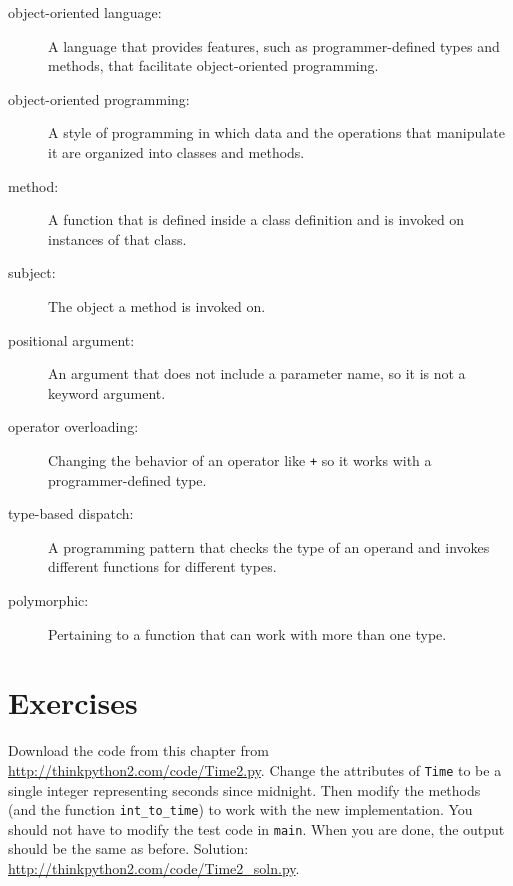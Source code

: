 \documentclass[10pt]{book}
\begin{document}
\begin{description}

\item[object-oriented language:] A language that provides features,
  such as programmer-defined types and methods, that facilitate
  object-oriented programming.

\item[object-oriented programming:] A style of programming in which
data and the operations that manipulate it are organized into classes
and methods.

\item[method:] A function that is defined inside a class definition and
is invoked on instances of that class.

\item[subject:] The object a method is invoked on.

\item[positional argument:]  An argument that does not include
a parameter name, so it is not a keyword argument.

\item[operator overloading:] Changing the behavior of an operator like
{\tt +} so it works with a programmer-defined type.

\item[type-based dispatch:] A programming pattern that checks the type
of an operand and invokes different functions for different types.

\item[polymorphic:] Pertaining to a function that can work with more
  than one type.  

\end{description}


\section{Exercises}

\begin{exercise}

Download the code from this chapter from
\url{http://thinkpython2.com/code/Time2.py}.  Change the attributes of
    {\tt Time} to be a single integer representing seconds since
    midnight.  Then modify the methods (and the function
    \verb"int_to_time") to work with the new implementation.  You
    should not have to modify the test code in {\tt main}.  When you
    are done, the output should be the same as before.  Solution:
    \url{http://thinkpython2.com/code/Time2_soln.py}.

\end{exercise}
\end{document}
